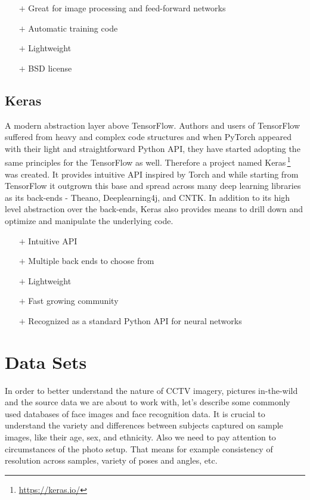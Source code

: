 \begin{itemize}
    \item[$\boldsymbol{+}$] Great for image processing and feed-forward networks
    \item[$\boldsymbol{+}$] Automatic training code
    \item[$\boldsymbol{+}$] Lightweight
    \item[$\boldsymbol{+}$] BSD license
\end{itemize}

\subsection{Keras}

A modern abstraction layer above TensorFlow. Authors and users of TensorFlow suffered from heavy and complex code structures and when PyTorch appeared with their light and straightforward Python API, they have started adopting the same principles for the TensorFlow as well. Therefore a project named Keras\,\footnote{\url{https://keras.io/}} was created. It provides intuitive API inspired by Torch and while starting from TensorFlow it outgrown this base and spread across many deep learning libraries as its back-ends - Theano, Deeplearning4j, and CNTK. In addition to its high level abstraction over the back-ends, Keras also provides means to drill down and optimize and manipulate the underlying code.

\begin{itemize}
    \item[$\boldsymbol{+}$] Intuitive API
    \item[$\boldsymbol{+}$] Multiple back ends to choose from
    \item[$\boldsymbol{+}$] Lightweight
    \item[$\boldsymbol{+}$] Fast growing community
    \item[$\boldsymbol{+}$] Recognized as a standard Python API for neural networks
\end{itemize}

\section{Data Sets}

In order to better understand the nature of CCTV imagery, pictures in-the-wild and the source data we are about to work with, let's describe some commonly used databases of face images and face recognition data. It is crucial to understand the variety and differences between subjects captured on sample images, like their age, sex, and ethnicity. Also we need to pay attention to circumstances of the photo setup. That means for example consistency of resolution across samples, variety of poses and angles, etc.

